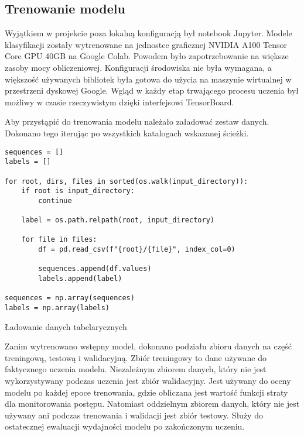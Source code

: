 \subsection{Trenowanie modelu}
\label{subsec:model-training}

Wyjątkiem w projekcie poza lokalną konfiguracją był notebook Jupyter. Modele klasyfikacji zostały wytrenowane na jednostce graficznej NVIDIA A100 Tensor Core GPU 40GB na Google Colab. Powodem było zapotrzebowanie na większe zasoby mocy obliczeniowej. Konfiguracji środowiska nie była wymagana, a większość używanych bibliotek była gotowa do użycia na maszynie wirtualnej w przestrzeni dyskowej Google. Wgląd w każdy etap trwającego procesu uczenia był możliwy w czasie rzeczywistym dzięki interfejsowi TensorBoard.

Aby przystąpić do trenowania modelu należało załadować zestaw danych. Dokonano tego iterując po wszystkich katalogach wskazanej ścieżki.

\begin{listing}[H]
    \color{white}
    \begin{verbatim}
sequences = []
labels = []

for root, dirs, files in sorted(os.walk(input_directory)):
    if root is input_directory:
        continue

    label = os.path.relpath(root, input_directory)

    for file in files:
        df = pd.read_csv(f"{root}/{file}", index_col=0)

        sequences.append(df.values)
        labels.append(label)

sequences = np.array(sequences)
labels = np.array(labels)
    \end{verbatim}
    \caption{Ładowanie danych tabelarycznych}
    \label{lst:tabular-data-loading}
\end{listing}

Zanim wytrenowano wstępny model, dokonano podziału zbioru danych na część treningową, testową i walidacyjną. Zbiór treningowy to dane używane do faktycznego uczenia modelu. Niezależnym zbiorem danych, który nie jest wykorzystywany podczas uczenia jest zbiór walidacyjny. Jest używany do oceny modelu po każdej epoce trenowania, gdzie obliczana jest wartość funkcji straty dla monitorowania postępu. Natomiast oddzielnym zbiorem danych, który nie jest używany ani podczas trenowania i walidacji jest zbiór testowy. Służy do ostatecznej ewaluacji wydajności modelu po zakończonym uczeniu.

